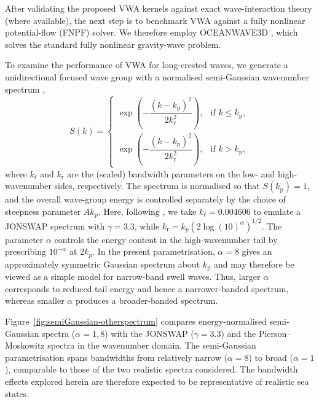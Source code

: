 \documentclass[lineno]{JFM-FLM_Au}
\begin{document}
After validating the proposed VWA kernels against exact wave-interaction theory (where available), the next step is to benchmark VWA against a fully nonlinear potential-flow (FNPF) solver. We therefore employ OCEANWAVE3D \citep{engsig-karup_efficient_2009,bingham_accuracy_2007}, which solves the standard fully nonlinear gravity-wave problem.

To examine the performance of VWA for long-crested waves, we generate a unidirectional focused wave group with a normalised semi-Gaussian wavenumber spectrum \citep{liu_phase_2025},
\begin{equation}\label{semi-gaussian}
S(k)=
\begin{cases}
\exp\!\left(-\dfrac{(k-k_{\mathrm{p}})^2}{2k_{\ell}^2}\right), & \text{if } k\le k_{\mathrm{p}},\\[1mm]
\exp\!\left(-\dfrac{(k-k_{\mathrm{p}})^2}{2k_{\mathrm{r}}^2}\right), & \text{if } k> k_{\mathrm{p}},
\end{cases}
\end{equation}
where $k_{\ell}$ and $k_{\mathrm{r}}$ are the (scaled) bandwidth parameters on the low- and high-wavenumber sides, respectively. The spectrum is normalised so that $S(k_{\mathrm{p}})=1$, and the overall wave-group energy is controlled separately by the choice of steepness parameter $Ak_{\mathrm{p}}$. Here, following \citep{gibbs_walls_2004}, we take $k_{\ell}=0.004606$ to emulate a JONSWAP spectrum with $\gamma=3.3$, while $k_{\mathrm{r}}=k_p(2\log(10)^{\alpha})^{1/2}$. The parameter $\alpha$ controls the energy content in the high-wavenumber tail by prescribing $10^{-\alpha}$ at $2k_p$. In the present parametrisation, $\alpha=8$ gives an approximately symmetric Gaussian spectrum about $k_{\mathrm{p}}$ and may therefore be viewed as a simple model for narrow-band swell waves. Thus, larger $\alpha$ corresponds to reduced tail energy and hence a narrower-banded spectrum, whereas smaller $\alpha$ produces a broader-banded spectrum.

Figure~\ref{fig:semiGaussian-otherspectrum} compares energy-normalised semi-Gaussian spectra ($\alpha=1,8$) with the JONSWAP  \citep{hasselmann_measurements_1973} ($\gamma=3.3$) and the Pierson--Moskowitz spectra \citep{pierson_proposed_1964} in the wavenumber domain. The semi-Gaussian parametrisation spans bandwidths from relatively narrow ($\alpha=8$) to broad ($\alpha=1$), comparable to those of the two realistic spectra considered. The bandwidth effects explored herein are therefore expected to be representative of realistic sea states.
\end{document}
